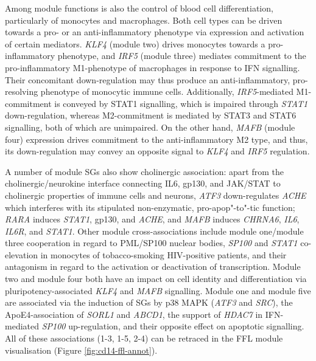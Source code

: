 Among module functions is also the control of blood cell differentiation, particularly of monocytes and macrophages. Both cell types can be driven towards a pro- or an anti-inflammatory phenotype via expression and activation of certain mediators. \emph{KLF4} (module two) drives monocytes towards a pro-inflammatory phenotype, and \emph{IRF5} (module three) mediates commitment to the pro-inflammatory M1-phenotype of macrophages in response to IFN signalling. Their concomitant down-regulation may thus produce an anti-inflammatory, pro-resolving phenotype of monocytic immune cells. Additionally, \emph{IRF5}-mediated M1-commitment is conveyed by STAT1 signalling, which is impaired through \emph{STAT1} down-regulation, whereas M2-commitment is mediated by STAT3 and STAT6 signalling, both of which are unimpaired. On the other hand, \emph{MAFB} (module four) expression drives commitment to the anti-inflammatory M2 type, and thus, its down-regulation may convey an opposite signal to \emph{KLF4} and \emph{IRF5} regulation. 

A number of module SGs also show cholinergic association: apart from the cholinergic/neurokine interface connecting IL6, gp130, and JAK/STAT to cholinergic properties of immune cells and neurons,\cite{Lobentanzer2019a} \emph{ATF3} down-regulates \emph{ACHE} which interferes with its stipulated non-enzymatic, pro-apop"-to"-tic function; \emph{RARA} induces \emph{STAT1}, gp130, and \emph{ACHE}, and \emph{MAFB} induces \emph{CHRNA6}, \emph{IL6}, \emph{IL6R}, and \emph{STAT1}. Other module cross-associations include module one/module three cooperation in regard to PML/SP100 nuclear bodies, \emph{SP100} and \emph{STAT1} co-elevation in monocytes of tobacco-smoking HIV-positive patients, and their antagonism in regard to the activation or deactivation of transcription. Module two and module four both have an impact on cell identity and differentiation via pluripotency-associated \emph{KLF4} and \emph{MAFB} signalling. Module one and module five are associated via the induction of SGs by p38 MAPK (\emph{ATF3} and \emph{SRC}), the ApoE4-association of \emph{SORL1} and \emph{ABCD1}, the support of \emph{HDAC7} in IFN-mediated \emph{SP100} up-regulation, and their opposite effect on apoptotic signalling. All of these associations (1-3, 1-5, 2-4) can be retraced in the FFL module visualisation (Figure \ref{fig:cd14-ffl-annot}).


